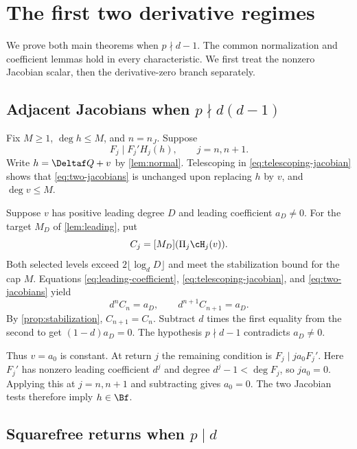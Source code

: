 \section{The first two derivative regimes}
\label{sec:jacobian}

We prove both main theorems when $p\nmid d-1$. The common
normalization and coefficient lemmas hold in every characteristic.
We first treat the nonzero Jacobian scalar, then the
derivative-zero branch separately.

\subsection{Adjacent Jacobians when \texorpdfstring{$p\nmid d(d-1)$}{p does not divide d(d-1)}}

Fix $M\ge1$, $\deg h\le M$, and $n=n_J$. Suppose
\begin{equation}
 F_j\mid F_j'H_j(h),\qquad j=n,n+1.
 \label{eq:two-jacobians}
\end{equation}
Write $h=\Deltaf Q+v$ by \cref{lem:normal}. Telescoping in
\eqref{eq:telescoping-jacobian} shows that
\eqref{eq:two-jacobians} is unchanged upon replacing $h$ by $v$,
and $\deg v\le M$.

Suppose $v$ has positive leading degree $D$ and leading
coefficient $a_D\ne0$. For the target $M_D$ of
\cref{lem:leading}, put
\[
 C_j=[M_D](\Pi_j\cH_j(v)).
\]
Both selected levels exceed $2\lfloor\log_dD\rfloor$ and meet
the stabilization bound for the cap $M$. Equations
\eqref{eq:leading-coefficient}, \eqref{eq:telescoping-jacobian},
and \eqref{eq:two-jacobians} yield
\begin{equation}
 d^nC_n=a_D,\qquad d^{n+1}C_{n+1}=a_D.
 \label{eq:two-leading-jacobians}
\end{equation}
By \cref{prop:stabilization}, $C_{n+1}=C_n$. Subtract $d$
times the first equality from the second to get
$(1-d)a_D=0$. The hypothesis $p\nmid d-1$ contradicts
$a_D\ne0$.

Thus $v=a_0$ is constant. At return $j$ the remaining condition
is $F_j\mid ja_0F_j'$. Here $F_j'$ has nonzero leading
coefficient $d^j$ and degree $d^j-1<\deg F_j$, so
$ja_0=0$. Applying this at $j=n,n+1$ and subtracting gives
$a_0=0$. The two Jacobian tests therefore imply $h\in\Bf$.

\subsection{Squarefree returns when \texorpdfstring{$p\mid d$}{p divides d}}

